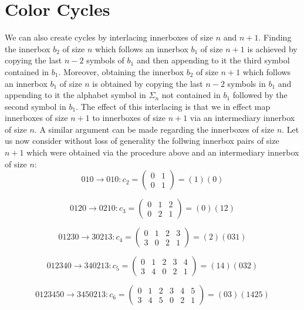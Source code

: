 \documentclass[a4paper,10pt]{article}
\theoremstyle{definition}
\begin{document}
\section{Color Cycles}
We can also create cycles by interlacing innerboxes of size $n$ and $n+1$. Finding the innerbox $b_2$ of size $n$ which follows an innerbox $b_1$ of size $n+1$ is achieved by copying the last $n-2$ symbols of $b_1$ and then appending to it the third symbol contained in $b_1$. Moreover, obtaining the innerbox $b_2$ of size $n+1$ which follows an innerbox $b_1$ of size $n$ is obtained by copying the last $n-2$ symbols in $b_1$ and appending to it the alphabet symbol in $\Sigma_n$ not contained in $b_1$ followed by the second symbol in $b_1$. The effect of this interlacing is that we in effect map innerboxes of size $n+1$ to innerboxes of size $n+1$ via an intermediary innerbox of size $n$. A similar argument can be made regarding the innerboxes of size $n$. Let us now consider without loss of generality the follwing innerbox pairs of size $n+1$ which were obtained via the procedure above and an intermediary innerbox of size $n$:
\begin{equation}
010\rightarrow010:c_2=
\begin{pmatrix}
0&1\\
0&1
\end{pmatrix} = (1)(0)
\end{equation}

\begin{equation}
0120\rightarrow0210:c_3=
\begin{pmatrix}
0&1&2\\
0&2&1
\end{pmatrix} = (0)(12)
\end{equation}

\begin{equation}
01230\rightarrow30213:c_4=
\begin{pmatrix}
0&1&2&3\\
3&0&2&1
\end{pmatrix} = (2)(031)
\end{equation}

\begin{equation}
012340\rightarrow340213:c_5=
\begin{pmatrix}
0&1&2&3&4\\
3&4&0&2&1
\end{pmatrix} = (14)(032)
\end{equation}

\begin{equation}
0123450\rightarrow3450213:c_6=
\begin{pmatrix}
0&1&2&3&4&5\\
3&4&5&0&2&1
\end{pmatrix} = (03)(1425)
\end{equation}
\end{document}
